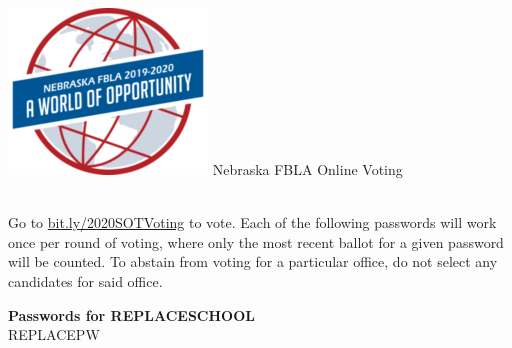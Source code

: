 \documentclass{article}
\begin{document}
\includegraphics[scale=0.5]{pdfs/logo.png}
{\Huge Nebraska FBLA Online Voting} \\ \\


{
    \begin{center}
    \large
    Go to \href{bit.ly/2020SOTVoting}{bit.ly/2020SOTVoting} to vote. Each of the following
    passwords will work once per round of voting, where only the most recent ballot for a
    given password will be counted. To abstain from voting for a particular office, do not
    select any candidates for said office. \\
    \end{center}
}

\large
\centering
\textbf{Passwords for REPLACESCHOOL} \\
REPLACEPW
\centering
\end{document}
